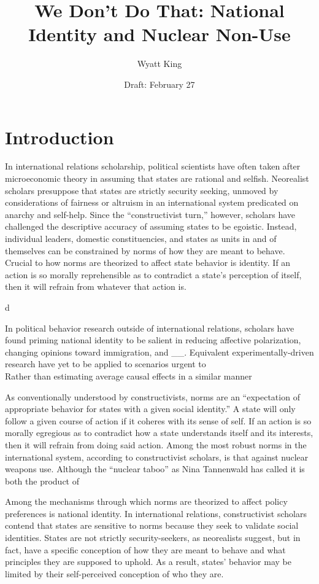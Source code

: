 \documentclass[12pt]{article}
\title{We Don't Do That: National Identity and Nuclear Non-Use}
\author{Wyatt King}
\date{Draft: February 27}
\begin{document}
\maketitle

\section{Introduction}

In international relations scholarship, political scientists have often taken after microeconomic theory in assuming that states are rational and selfish. Neorealist scholars presuppose that states are strictly security seeking, unmoved by considerations of fairness or altruism in an international system predicated on anarchy and self-help. Since the “constructivist turn,” however, scholars have challenged the descriptive accuracy of assuming states to be egoistic. Instead, individual leaders, domestic constituencies, and states as units in and of themselves can be constrained by norms of how they are meant to behave. Crucial to how norms are theorized to affect state behavior is identity. If an action is so morally reprehensible as to contradict a state's perception of itself, then it will refrain from whatever that action is.

d

In political behavior research outside of international relations, scholars have found priming national identity to be salient in reducing affective polarization, changing opinions toward immigration, and \_\_. Equivalent experimentally-driven research have yet to be applied to scenarios urgent to  \\

Rather than estimating average causal effects in a similar manner 

As conventionally understood by constructivists, norms are an “expectation of appropriate behavior for states with a given social identity.” A state will only follow a given course of action if it coheres with its sense of self. If an action is so morally egregious as to contradict how a state understands itself and its interests, then it will refrain from doing said action. Among the most robust norms in the international system, according to constructivist scholars, is that against nuclear weapons use. Although the “nuclear taboo” as Nina Tannenwald has called it is both the product of

Among the mechanisms through which norms are theorized to affect policy preferences is national identity. In international relations, constructivist scholars contend that states are sensitive to norms because they seek to validate social identities. States are not strictly security-seekers, as neorealists suggest, but in fact, have a specific conception of how they are meant to behave and what principles they are supposed to uphold. As a result, states' behavior may be limited by their self-perceived conception of who they are. 
\end{document}
